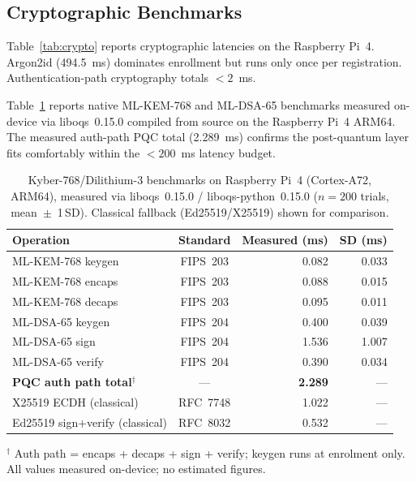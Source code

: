\documentclass[conference]{IEEEtran}
\begin{document}
\subsection{Cryptographic Benchmarks}

Table~\ref{tab:crypto} reports cryptographic latencies on the Raspberry Pi~4.
Argon2id (494.5~ms) dominates enrollment but runs only once per registration.
Authentication-path cryptography totals \(<2\)~ms.

Table~\ref{tab:pqc_benchmarks} reports native ML-KEM-768 and ML-DSA-65
benchmarks measured on-device via liboqs~0.15.0 compiled from source
on the Raspberry Pi~4 ARM64. The measured auth-path PQC total (2.289~ms)
confirms the post-quantum layer fits comfortably within the
\(<200\)~ms latency budget.

\begin{table}[t]
\centering
\caption{Kyber-768/Dilithium-3 benchmarks on Raspberry Pi~4
  (Cortex-A72, ARM64), measured via liboqs~0.15.0 / liboqs-python~0.15.0
  (\(n{=}200\) trials, mean~$\pm$~1\,SD).
  Classical fallback (Ed25519/X25519) shown for comparison.}
\label{tab:pqc_benchmarks}
\begin{tabular}{lcrr}
  \toprule
  Operation & Standard & Measured (ms) & SD (ms) \\
  \midrule
  ML-KEM-768 keygen   & FIPS~203 & 0.082 & 0.033 \\
  ML-KEM-768 encaps   & FIPS~203 & 0.088 & 0.015 \\
  ML-KEM-768 decaps   & FIPS~203 & 0.095 & 0.011 \\
  ML-DSA-65 keygen    & FIPS~204 & 0.400 & 0.039 \\
  ML-DSA-65 sign      & FIPS~204 & 1.536 & 1.007 \\
  ML-DSA-65 verify    & FIPS~204 & 0.390 & 0.034 \\
  \midrule
  \textbf{PQC auth path total}$^\dagger$ & — & \textbf{2.289} & — \\
  \midrule
  X25519 ECDH (classical) & RFC~7748 & 1.022 & — \\
  Ed25519 sign+verify (classical) & RFC~8032 & 0.532 & — \\
  \bottomrule
\end{tabular}
\begin{minipage}{\linewidth}
\vspace{2pt}
{\footnotesize $^\dagger$ Auth path = encaps + decaps + sign + verify;
  keygen runs at enrolment only. All values measured on-device;
  no estimated figures.}
\end{minipage}
\end{table}
\end{document}
